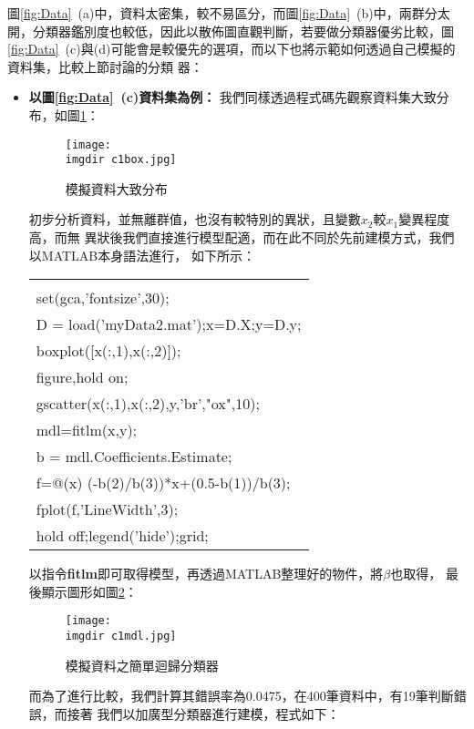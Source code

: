		圖\ref{fig:Data}\ (a)中，資料太密集，較不易區分，而圖\ref{fig:Data}\ (b)中，兩群分太			開，分類器鑑別度也較低，因此以散佈圖直觀判斷，若要做分類器優劣比較，圖\ref{fig:Data}\ 			(c)與(d)可能會是較優先的選項，而以下也將示範如何透過自己模擬的資料集，比較上節討論的分類			器：
		\begin{itemize}	
			\item{\textbf{以圖\ref{fig:Data}\ (c)資料集為例：}
				我們同樣透過程式碼先觀察資料集大致分布，如圖\ref{fig:c1box}：
				\begin{figure}[H]	
		 			\centering	 			 	 
   					\texttt{[image: \\imgdir c1box.jpg]} 
   					\caption{模擬資料大致分布}   		
   					\label{fig:c1box}   			 		 
				\end{figure}
				初步分析資料，並無離群值，也沒有較特別的異狀，且變數$x_2$較$x_1$變異程度高，而無					異狀後我們直接進行模型配適，而在此不同於先前建模方式，我們以MATLAB本身語法進行，					如下所示：
				\begin{center}\colorbox{slight}{
					\begin{tabular}{p{}}
						\MJHmarker{\textbf{\color{darkblue}{MATLAB語法 :}}}\\		
						set(gca,'fontsize',30);\\
						D = load('myData2.mat');x=D.X;y=D.y;\\
						boxplot([x(:,1),x(:,2)]);\\
						figure,hold on;\\
						gscatter(x(:,1),x(:,2),y,'br',"ox",10);\\
						mdl=fitlm(x,y);\\
						b = mdl.Coefficients.Estimate;\\
						f=@(x) (-b(2)/b(3))*x+(0.5-b(1))/b(3);\\
						fplot(f,'LineWidth',3);\\
						hold off;legend('hide');grid;\\	
					\end{tabular}
				}
				\end{center}
				以指令\textbf{fitlm}即可取得模型，再透過MATLAB整理好的物件，將$\beta$也取得，					最後顯示圖形如圖\ref{fig:c1mdl}：
				\begin{figure}[H]	
		 			\centering	 			 	 
   					\texttt{[image: \\imgdir c1mdl.jpg]} 
   					\caption{模擬資料之簡單迴歸分類器}   		
   					\label{fig:c1mdl}   			 		 
				\end{figure}
				而為了進行比較，我們計算其錯誤率為0.0475，在400筆資料中，有19筆判斷錯誤，而接著					我們以加廣型分類器進行建模，程式如下：
}
\end{itemize}
